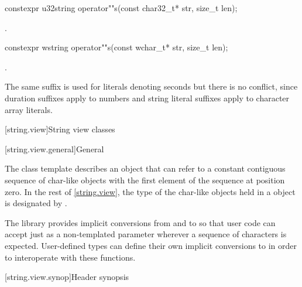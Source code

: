%
\begin{itemdecl}
constexpr u32string operator""s(const char32_t* str, size_t len);
\end{itemdecl}
\begin{itemdescr}
\pnum
\returns
{}.
\end{itemdescr}

%
\begin{itemdecl}
constexpr wstring operator""s(const wchar_t* str, size_t len);
\end{itemdecl}
\begin{itemdescr}
\pnum
\returns
{}.
\end{itemdescr}

\pnum
\begin{note}
The same suffix  is used for  literals denoting seconds but there is no conflict, since duration suffixes apply to numbers and string literal suffixes apply to character array literals.
\end{note}

[string.view]{String view classes}

[string.view.general]{General}

\pnum
The class template  describes an object that can refer to a constant contiguous sequence of char-like objects with the first element of the sequence at position zero.
In the rest of \ref{string.view}, the type of the char-like objects held in a  object is designated by .

\pnum
\begin{note}
The library provides implicit conversions from  and  to  so that user code can accept just  as a non-templated parameter wherever a sequence of characters is expected.
User-defined types can define their own implicit conversions to  in order to interoperate with these functions.
\end{note}

[string.view.synop]{Header  synopsis}

